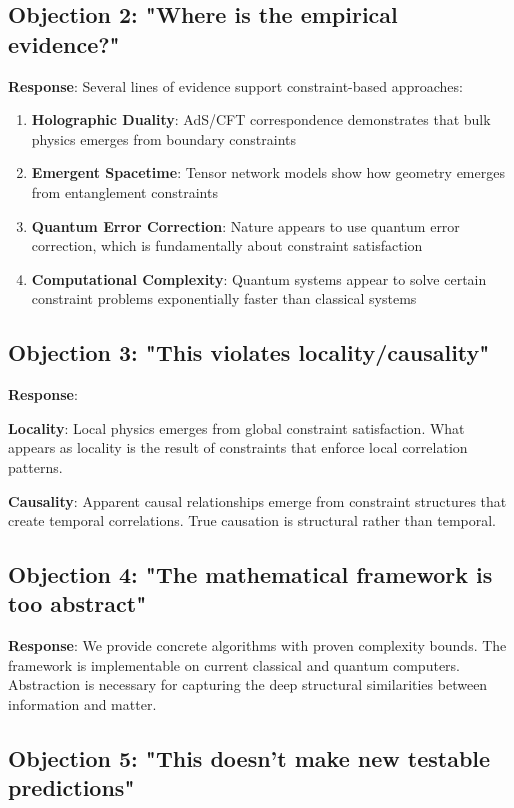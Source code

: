 \documentclass[11pt]{article}
\theoremstyle{definition}
\begin{document}
\subsection{Objection 2: "Where is the empirical evidence?"}

\textbf{Response}: Several lines of evidence support constraint-based approaches:

\begin{enumerate}
\item \textbf{Holographic Duality}: AdS/CFT correspondence demonstrates that bulk physics emerges from boundary constraints
\item \textbf{Emergent Spacetime}: Tensor network models show how geometry emerges from entanglement constraints
\item \textbf{Quantum Error Correction}: Nature appears to use quantum error correction, which is fundamentally about constraint satisfaction
\item \textbf{Computational Complexity}: Quantum systems appear to solve certain constraint problems exponentially faster than classical systems
\end{enumerate}

\subsection{Objection 3: "This violates locality/causality"}

\textbf{Response}: 

\textbf{Locality}: Local physics emerges from global constraint satisfaction. What appears as locality is the result of constraints that enforce local correlation patterns.

\textbf{Causality}: Apparent causal relationships emerge from constraint structures that create temporal correlations. True causation is structural rather than temporal.

\subsection{Objection 4: "The mathematical framework is too abstract"}

\textbf{Response}: We provide concrete algorithms with proven complexity bounds. The framework is implementable on current classical and quantum computers. Abstraction is necessary for capturing the deep structural similarities between information and matter.

\subsection{Objection 5: "This doesn't make new testable predictions"}
\end{document}
